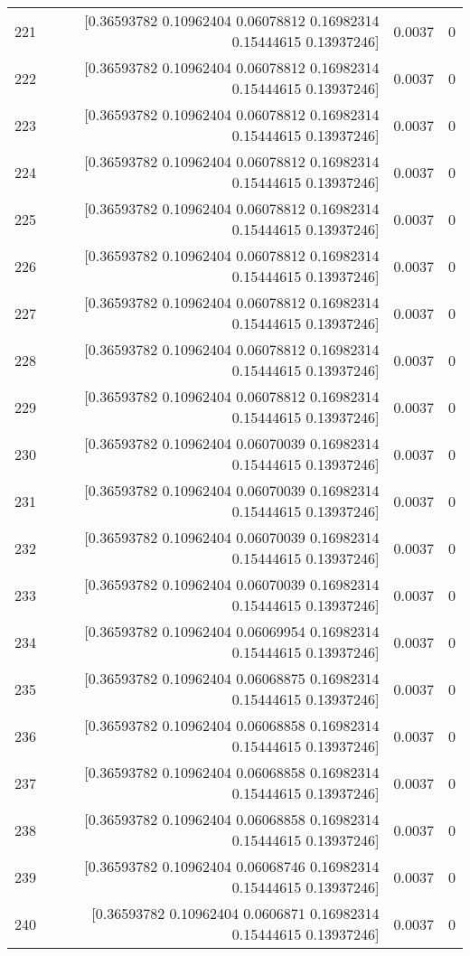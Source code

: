 \begin{longtable}{lrrr}
221 & [0.36593782 0.10962404 0.06078812 0.16982314 0.15444615 0.13937246] & 0.0037 & 0 \\
222 & [0.36593782 0.10962404 0.06078812 0.16982314 0.15444615 0.13937246] & 0.0037 & 0 \\
223 & [0.36593782 0.10962404 0.06078812 0.16982314 0.15444615 0.13937246] & 0.0037 & 0 \\
224 & [0.36593782 0.10962404 0.06078812 0.16982314 0.15444615 0.13937246] & 0.0037 & 0 \\
225 & [0.36593782 0.10962404 0.06078812 0.16982314 0.15444615 0.13937246] & 0.0037 & 0 \\
226 & [0.36593782 0.10962404 0.06078812 0.16982314 0.15444615 0.13937246] & 0.0037 & 0 \\
227 & [0.36593782 0.10962404 0.06078812 0.16982314 0.15444615 0.13937246] & 0.0037 & 0 \\
228 & [0.36593782 0.10962404 0.06078812 0.16982314 0.15444615 0.13937246] & 0.0037 & 0 \\
229 & [0.36593782 0.10962404 0.06078812 0.16982314 0.15444615 0.13937246] & 0.0037 & 0 \\
230 & [0.36593782 0.10962404 0.06070039 0.16982314 0.15444615 0.13937246] & 0.0037 & 0 \\
231 & [0.36593782 0.10962404 0.06070039 0.16982314 0.15444615 0.13937246] & 0.0037 & 0 \\
232 & [0.36593782 0.10962404 0.06070039 0.16982314 0.15444615 0.13937246] & 0.0037 & 0 \\
233 & [0.36593782 0.10962404 0.06070039 0.16982314 0.15444615 0.13937246] & 0.0037 & 0 \\
234 & [0.36593782 0.10962404 0.06069954 0.16982314 0.15444615 0.13937246] & 0.0037 & 0 \\
235 & [0.36593782 0.10962404 0.06068875 0.16982314 0.15444615 0.13937246] & 0.0037 & 0 \\
236 & [0.36593782 0.10962404 0.06068858 0.16982314 0.15444615 0.13937246] & 0.0037 & 0 \\
237 & [0.36593782 0.10962404 0.06068858 0.16982314 0.15444615 0.13937246] & 0.0037 & 0 \\
238 & [0.36593782 0.10962404 0.06068858 0.16982314 0.15444615 0.13937246] & 0.0037 & 0 \\
239 & [0.36593782 0.10962404 0.06068746 0.16982314 0.15444615 0.13937246] & 0.0037 & 0 \\
240 & [0.36593782 0.10962404 0.0606871  0.16982314 0.15444615 0.13937246] & 0.0037 & 0 \\

\end{longtable}
